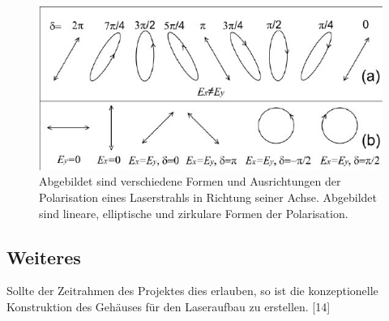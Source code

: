 \begin{figure}[H]
    \centering
    \includegraphics[scale=0.5, trim={5mm 10mm 0 14mm},clip]{98_images/laser_polarization_forms_directions.jpg}
    \caption{Abgebildet sind verschiedene Formen und Ausrichtungen der Polarisation eines Laserstrahls in Richtung seiner Achse. Abgebildet sind lineare, elliptische und zirkulare Formen der Polarisation.}
    \label{fig:polarization_forms_directions}
\end{figure}
\subsection{Weiteres}
Sollte der Zeitrahmen des Projektes dies erlauben, so ist die konzeptionelle Konstruktion des Gehäuses für den Laseraufbau zu erstellen. [14]